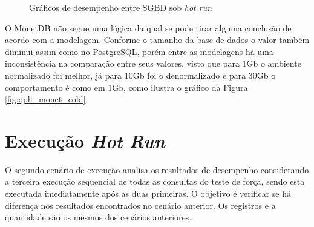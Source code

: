 \begin{figure}[htpb]
        \centering
        \caption{Gráficos de desempenho entre SGBD sob \textit{hot run}}
        \label{fig:qph_sgbd_cold}
\end{figure}

O MonetDB não segue uma lógica da qual se pode tirar alguma conclusão de acordo com a modelagem. Conforme o tamanho da base de dados o valor também diminui assim como no PostgreSQL, porém entre as modelagens há uma inconsistência na comparação entre seus valores, visto que para 1Gb o ambiente normalizado foi melhor, já para 10Gb foi o denormalizado e para 30Gb o comportamento é como em 1Gb, como ilustra o gráfico da Figura \ref{fig:qph_monet_cold}. 


\section{Execução \textit{Hot Run}}

O segundo cenário de execução analisa os resultados de desempenho considerando a terceira execução sequencial de todas as consultas do teste de força, sendo esta executada imediatamente após as duas primeiras. O objetivo é verificar se há diferença nos resultados encontrados no cenário anterior. Os registros e a quantidade são os mesmos dos cenários anteriores. 

